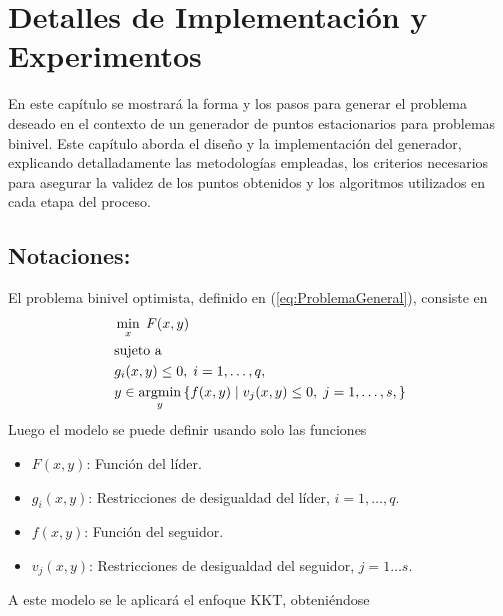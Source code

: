 \chapter{Detalles de Implementación y Experimentos}\label{chapter:implementation}

En este capítulo se mostrará la forma y los pasos para generar el problema deseado en el contexto de un generador de puntos estacionarios para problemas binivel. Este capítulo aborda el diseño y la implementación del generador, explicando detalladamente las metodologías empleadas, los criterios necesarios para asegurar la validez de los puntos obtenidos y los algoritmos utilizados en cada etapa del proceso.

\section{Notaciones:}
 El problema binivel optimista, definido en (\ref{eq:ProblemaGeneral}), consiste en
\begin{equation}
\begin{aligned}
& \min_{x} \; F(x, y) \\
& \text{sujeto a } \\
& g_i(x, y)\leq 0,\;i=1,\ldots,q, \\
& y \in \operatorname*{argmin}_{y} \left\{ f(x, y) \mid v_j(x, y)\leq 0,\;j=1,\ldots,s ,\right\}
\end{aligned}
\end{equation}
Luego el modelo se puede definir usando solo las funciones 
\begin{itemize}
    \item$F(x,y)$: Función del líder.                                                                                                          \\
       \item $ g_i(x,y) $:               Restricciones de desigualdad del líder,  $ i=1,\ldots, q$.       \\
        \item $ f(x,y) $:            Función del seguidor.                                                               \\
       \item $ v_j(x,y) $:                Restricciones de desigualdad del seguidor, $j=1\ldots s$.   \\
    \end{itemize}
A este modelo se le aplicará el enfoque KKT, obteniéndose
